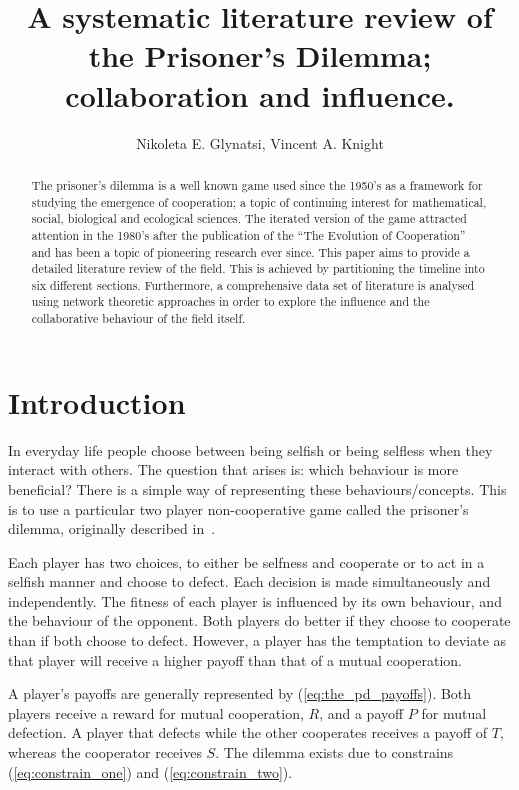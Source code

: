 \documentclass{article}
\title{A systematic literature review of the Prisoner's Dilemma; collaboration and influence.}
\author{Nikoleta E. Glynatsi, Vincent A. Knight}
\date{}
\theoremstyle{definition}
\begin{document}
\maketitle

\begin{abstract}
    The prisoner's dilemma is a well known game used since the 1950's as a framework
    for studying the emergence of cooperation; a topic of continuing interest
    for mathematical, social, biological and ecological sciences. The iterated version
    of the game attracted attention in the 1980's after
    the publication of the ``The Evolution of Cooperation'' and has been a topic
    of pioneering research ever since. This paper aims to provide a detailed
    literature review of the field. This is achieved by partitioning the timeline into six different
    sections. Furthermore, a comprehensive data set of literature is analysed
    using network theoretic approaches in order to explore the influence and the
    collaborative behaviour of the field itself.
\end{abstract}

\section{Introduction}\label{section:introduction}

In everyday life people choose between being selfish or being selfless when they
interact with others. The question that arises is: which behaviour is more beneficial?
There is a simple way of representing these behaviours/concepts. This is to use a
particular two player non-cooperative game called the prisoner's dilemma, originally
described in~\cite{Flood1958}.

Each player has two choices, to either be selfness and cooperate or to act in a
selfish manner and choose to defect. Each decision is made simultaneously and independently.
The fitness of each player is influenced by its own behaviour, and the behaviour
of the opponent. Both players do better if they choose to cooperate than if both
choose to defect. However, a player has the temptation to deviate as that player will
receive a higher payoff than that of a mutual cooperation.

A player's payoffs are generally represented by (\ref{eq:the_pd_payoffs}). Both
players receive a reward for mutual cooperation, \(R\), and a payoff \(P\) for
mutual defection. A player that defects while the other cooperates receives a payoff of
\(T\), whereas the cooperator receives \(S\). The dilemma exists due
to constrains (\ref{eq:constrain_one}) and (\ref{eq:constrain_two}).
\end{document}
